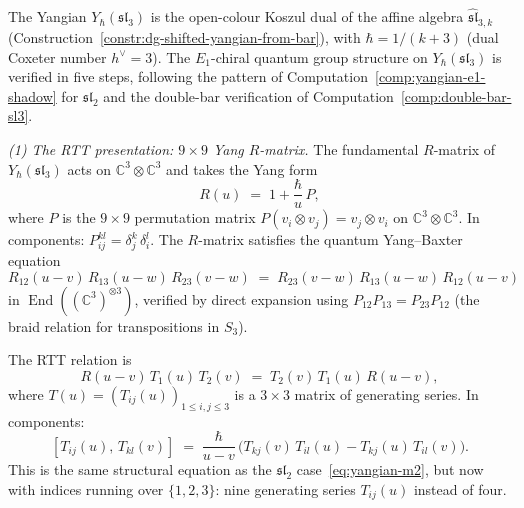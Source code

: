 \begin{example}%
\label{ex:yangian-sl3-e1-chiral-qg}%
%
%
%
%
%
The Yangian $Y_\hbar(\mathfrak{sl}_3)$ is the open-colour
Koszul dual of the affine algebra
$\widehat{\mathfrak{sl}}_{3,k}$
(Construction~\ref{constr:dg-shifted-yangian-from-bar}),
with $\hbar = 1/(k{+}3)$ (dual Coxeter number $h^\vee = 3$).
The $E_1$-chiral quantum group structure on
$Y_\hbar(\mathfrak{sl}_3)$ is verified in five steps,
following the pattern of
Computation~\ref{comp:yangian-e1-shadow} for $\mathfrak{sl}_2$
and the double-bar verification of
Computation~\ref{comp:double-bar-sl3}.

\medskip
\noindent\emph{(1) The RTT presentation: $9\times 9$ Yang
$R$-matrix.}
The fundamental $R$-matrix of $Y_\hbar(\mathfrak{sl}_3)$ acts
on
$\mathbb{C}^3\otimes\mathbb{C}^3$ and takes the Yang form
\begin{equation}\label{eq:sl3-yang-R}
R(u)
\;=\;
1 + \frac{\hbar}{u}\,P,
\end{equation}
where $P$ is the $9\times 9$ permutation matrix
$P(v_i\otimes v_j) = v_j\otimes v_i$ on
$\mathbb{C}^3\otimes\mathbb{C}^3$. In components:
$P^{kl}_{ij} = \delta^k_j\,\delta^l_i$.
The $R$-matrix satisfies the quantum Yang--Baxter equation
\begin{equation}\label{eq:sl3-qybe}
R_{12}(u{-}v)\,R_{13}(u{-}w)\,R_{23}(v{-}w)
\;=\;
R_{23}(v{-}w)\,R_{13}(u{-}w)\,R_{12}(u{-}v)
\end{equation}
in $\operatorname{End}((\mathbb{C}^3)^{\otimes 3})$,
verified by direct expansion using $P_{12}P_{13} = P_{23}P_{12}$
(the braid relation for transpositions in $S_3$).

The RTT relation is
\begin{equation}\label{eq:sl3-rtt}
R(u{-}v)\,T_1(u)\,T_2(v)
\;=\;
T_2(v)\,T_1(u)\,R(u{-}v),
\end{equation}
where $T(u) = (T_{ij}(u))_{1\le i,j\le 3}$ is a $3\times 3$
matrix of generating series. In components:
\begin{equation}\label{eq:sl3-rtt-components}
[T_{ij}(u),\,T_{kl}(v)]
\;=\;
\frac{\hbar}{u{-}v}\,
\bigl(T_{kj}(v)\,T_{il}(u) - T_{kj}(u)\,T_{il}(v)\bigr).
\end{equation}
This is the same structural equation as the $\mathfrak{sl}_2$
case~\eqref{eq:yangian-m2}, but now with indices running
over $\{1,2,3\}$: nine generating series $T_{ij}(u)$
instead of four.


\end{example}
